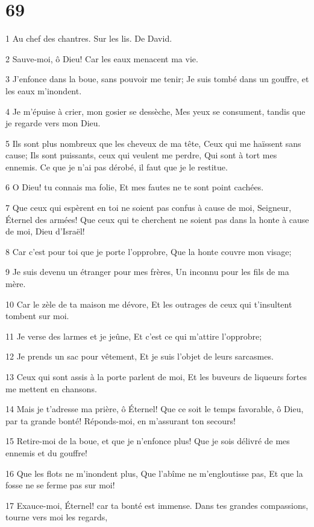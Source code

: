 \chapter{69}

\par 1 Au chef des chantres. Sur les lis. De David.
\par 2 Sauve-moi, ô Dieu! Car les eaux menacent ma vie.
\par 3 J'enfonce dans la boue, sans pouvoir me tenir; Je suis tombé dans un gouffre, et les eaux m'inondent.
\par 4 Je m'épuise à crier, mon gosier se dessèche, Mes yeux se consument, tandis que je regarde vers mon Dieu.
\par 5 Ils sont plus nombreux que les cheveux de ma tête, Ceux qui me haïssent sans cause; Ils sont puissants, ceux qui veulent me perdre, Qui sont à tort mes ennemis. Ce que je n'ai pas dérobé, il faut que je le restitue.
\par 6 O Dieu! tu connais ma folie, Et mes fautes ne te sont point cachées.
\par 7 Que ceux qui espèrent en toi ne soient pas confus à cause de moi, Seigneur, Éternel des armées! Que ceux qui te cherchent ne soient pas dans la honte à cause de moi, Dieu d'Israël!
\par 8 Car c'est pour toi que je porte l'opprobre, Que la honte couvre mon visage;
\par 9 Je suis devenu un étranger pour mes frères, Un inconnu pour les fils de ma mère.
\par 10 Car le zèle de ta maison me dévore, Et les outrages de ceux qui t'insultent tombent sur moi.
\par 11 Je verse des larmes et je jeûne, Et c'est ce qui m'attire l'opprobre;
\par 12 Je prends un sac pour vêtement, Et je suis l'objet de leurs sarcasmes.
\par 13 Ceux qui sont assis à la porte parlent de moi, Et les buveurs de liqueurs fortes me mettent en chansons.
\par 14 Mais je t'adresse ma prière, ô Éternel! Que ce soit le temps favorable, ô Dieu, par ta grande bonté! Réponds-moi, en m'assurant ton secours!
\par 15 Retire-moi de la boue, et que je n'enfonce plus! Que je sois délivré de mes ennemis et du gouffre!
\par 16 Que les flots ne m'inondent plus, Que l'abîme ne m'engloutisse pas, Et que la fosse ne se ferme pas sur moi!
\par 17 Exauce-moi, Éternel! car ta bonté est immense. Dans tes grandes compassions, tourne vers moi les regards,
